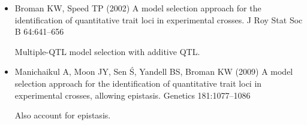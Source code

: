 \documentclass[12pt]{article}
\begin{document}
\hspace*{0.5in}
\begin{minipage}{9.5in}
\begin{itemize}
\itemsep8pt
\item Broman KW, Speed TP (2002) A model selection approach for the
  identification of quantitative trait loci in experimental crosses. J
  Roy Stat Soc B 64:641--656

{\color{myblue} Multiple-QTL model selection with additive QTL.}

\item Manichaikul A, Moon JY, Sen \'S, Yandell BS, Broman KW (2009) A
  model selection approach for the identification of quantitative
  trait loci in experimental crosses, allowing epistasis. Genetics
  181:1077--1086

{\color{myblue} Also account for epistasis.}

\end{itemize}
\end{minipage}
\end{document}
